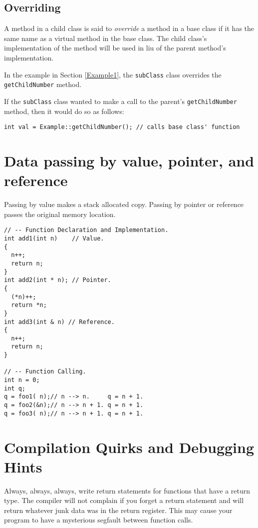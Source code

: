 \documentclass[12pt, letterpaper]{article}
\begin{document}
\subsection{Overriding}

A method in a child class is said to \textit{override} a method in a base class if it has the same name as a virtual method in the base class. The child class's implementation of the method will be used in liu of the parent method's implementation. 

In the example in Section \ref{Example1}, the \texttt{subClass} class overrides the \texttt{getChildNumber} method.

If the \texttt{subClass} class wanted to make a call to the parent's \texttt{getChildNumber} method, then it would do so as follows:
\begin{verbatim}
int val = Example::getChildNumber(); // calls base class' function
\end{verbatim}

\section{Data passing by value, pointer, and reference}

Passing by value makes a stack allocated copy. Passing by pointer or reference passes the original memory location.

\begin{verbatim}
// -- Function Declaration and Implementation.
int add1(int n)    // Value.
{
  n++;
  return n;
}
int add2(int * n); // Pointer.
{
  (*n)++;
  return *n;
}
int add3(int & n) // Reference.
{
  n++;
  return n;
}

// -- Function Calling.
int n = 0;
int q;
q = foo1( n);// n --> n.     q = n + 1.
q = foo2(&n);// n --> n + 1. q = n + 1.
q = foo3( n);// n --> n + 1. q = n + 1.
\end{verbatim}

\newpage

\section{Compilation Quirks and Debugging Hints}

Always, always, always, write return statements for functions that have a return type. The compiler will not complain if you forget a return statement and will return whatever junk data was in the return register. This may cause your program to have a mysterious segfault between function calls.\\
\end{document}
